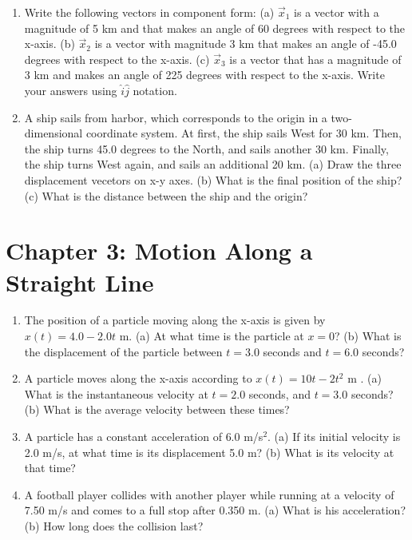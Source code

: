 \documentclass[10pt]{article}
\begin{document}
\begin{enumerate}
\item Write the following vectors in component form: (a) $\vec{x}_1$ is a vector with a magnitude of 5 km and that makes an angle of 60 degrees with respect to the x-axis. (b) $\vec{x}_2$ is a vector with magnitude 3 km that makes an angle of -45.0 degrees with respect to the x-axis. (c) $\vec{x}_3$ is a vector that has a magnitude of 3 km and makes an angle of 225 degrees with respect to the x-axis.  Write your answers using $\hat{i} \hat{j}$ notation.  \\ \vspace{3cm}
\item A ship sails from harbor, which corresponds to the origin in a two-dimensional coordinate system.  At first, the ship sails West for 30 km.  Then, the ship turns 45.0 degrees to the North, and sails another 30 km.  Finally, the ship turns West again, and sails an additional 20 km.  (a) Draw the three displacement vecetors on x-y axes.  (b) What is the final position of the ship?  (c) What is the distance between the ship and the origin? \\ \vspace{3cm}
\end{enumerate}

\section{Chapter 3: Motion Along a Straight Line}

\begin{enumerate}
\item The position of a particle moving along the x-axis is given by $x(t) = 4.0 - 2.0t$ m. (a) At what time is the particle at $x=0$? (b) What is the displacement of the particle between $t=3.0$ seconds and $t=6.0$ seconds? \\ \vspace{2cm}
\item A particle moves along the x-axis according to $x(t) = 10t - 2t^2$ m . (a) What is the instantaneous velocity at $t=2.0$ seconds, and $t=3.0$ seconds? (b) What is the average velocity between these times? \\ \vspace{3cm}
\item A particle has a constant acceleration of $6.0$ m/s$^2$.  (a) If its initial velocity is 2.0 m/s, at what time is its displacement 5.0 m? (b) What is its velocity at that time? \\ \vspace{3cm}
\item A football player collides with another player while running at a velocity of 7.50 m/s and comes to a full stop after 0.350 m. (a) What is his acceleration? (b) How long does
the collision last? \\ \vspace{4cm}
\end{enumerate}
\end{document}
